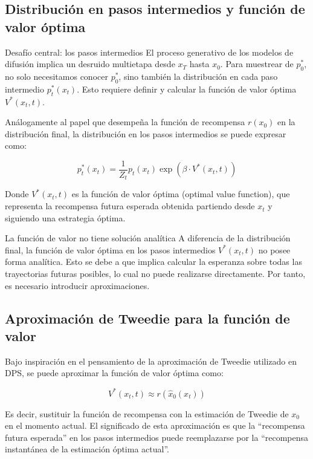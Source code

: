 \subsection{Distribución en pasos intermedios y función de valor óptima}

\begin{importantbox}{Desafío central: los pasos intermedios}
El proceso generativo de los modelos de difusión implica un desruido multietapa desde $x_T$ hasta $x_0$. Para muestrear de $p_0^*$, no solo necesitamos conocer $p_0^*$, sino también la distribución en cada paso intermedio $p_t^*(x_t)$. Esto requiere definir y calcular la función de valor óptima $V^*(x_t, t)$.
\end{importantbox}

Análogamente al papel que desempeña la función de recompensa $r(x_0)$ en la distribución final, la distribución en los pasos intermedios se puede expresar como:

$$p_t^*(x_t) = \frac{1}{Z_t} p_t(x_t) \exp(\beta \cdot V^*(x_t, t))$$

Donde $V^*(x_t, t)$ es la función de valor óptima (optimal value function), que representa la recompensa futura esperada obtenida partiendo desde $x_t$ y siguiendo una estrategia óptima.

\begin{warningbox}{La función de valor no tiene solución analítica}
A diferencia de la distribución final, la función de valor óptima en los pasos intermedios $V^*(x_t, t)$ no posee forma analítica. Esto se debe a que implica calcular la esperanza sobre todas las trayectorias futuras posibles, lo cual no puede realizarse directamente. Por tanto, es necesario introducir aproximaciones.
\end{warningbox}

\subsection{Aproximación de Tweedie para la función de valor}

Bajo inspiración en el pensamiento de la aproximación de Tweedie utilizado en DPS, se puede aproximar la función de valor óptima como:

$$V^*(x_t, t) \approx r(\hat{x}_0(x_t))$$

Es decir, sustituir la función de recompensa con la estimación de Tweedie de $x_0$ en el momento actual. El significado de esta aproximación es que la ``recompensa futura esperada'' en los pasos intermedios puede reemplazarse por la ``recompensa instantánea de la estimación óptima actual''.

